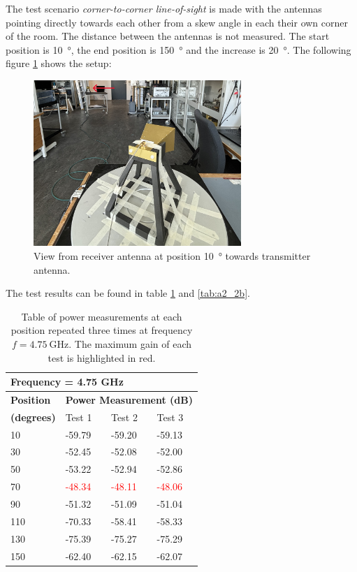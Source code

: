 The test scenario \textit{corner-to-corner line-of-sight} is made with the antennas pointing directly towards each other from a skew angle in each their own corner of the room. The distance between the antennas is not measured. The start position is \SI{10}{\degree}, the end position is \SI{150}{\degree} and the increase is \SI{20}{\degree}. The following figure \ref{fig:a2_2} shows the setup:
\begin{figure}[H]
    \centering
    \includegraphics[width=0.7\textwidth]{figures/test_los_corner.JPG}
    \caption{View from receiver antenna at position \SI{10}{\degree} towards transmitter antenna.} \label{fig:a2_2}
\end{figure}

The test results can be found in table \ref{tab:a2_2a} and \ref{tab:a2_2b}.
\begin{table}[H]
    \centering
    \begin{tabular}{l|l|l|l}
        \multicolumn{4}{l}{\textbf{Frequency = 4.75 GHz}}         \\
        \hline
        \textbf{Position} & \multicolumn{3}{l}{\textbf{Power Measurement (dB)}} \\
        \textbf{(degrees)}  & Test 1    & Test 2  & Test 3  \\
        \hline
        \hline
        10      & -59.79    & -59.20    & -59.13 \\
        30      & -52.45    & -52.08    & -52.00 \\
        50      & -53.22    & -52.94    & -52.86 \\
        70      & \textcolor{red}{-48.34}    & \textcolor{red}{-48.11}    & \textcolor{red}{-48.06} \\
        90      & -51.32    & -51.09    & -51.04 \\
        110     & -70.33    & -58.41    & -58.33 \\
        130     & -75.39    & -75.27    & -75.29 \\
        150     & -62.40    & -62.15    & -62.07
        \end{tabular}
    \caption{Table of power measurements at each position repeated three times at frequency $f=\SI{4.75}{\giga\hertz}$. The maximum gain of each test is highlighted in red.}
    \label{tab:a2_2a}
\end{table}

